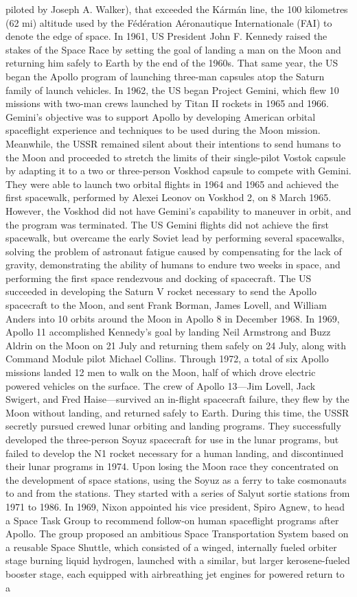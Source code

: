\documentclass[12pt]{article}
\begin{document}
piloted by Joseph A. Walker), that exceeded the Kármán line, the 100 kilometres (62 mi) altitude used by the Fédération Aéronautique Internationale (FAI) to denote the edge of space. In 1961, US President John F. Kennedy raised the stakes of the Space Race by setting the goal of landing a man on the Moon and returning him safely to Earth by the end of the 1960s. That same year, the US began the Apollo program of launching three-man capsules atop the Saturn family of launch vehicles. In 1962, the US began Project Gemini, which flew 10 missions with two-man crews launched by Titan II rockets in 1965 and 1966. Gemini's objective was to support Apollo by developing American orbital spaceflight experience and techniques to be used during the Moon mission. Meanwhile, the USSR remained silent about their intentions to send humans to the Moon and proceeded to stretch the limits of their single-pilot Vostok capsule by adapting it to a two or three-person Voskhod capsule to compete with Gemini. They were able to launch two orbital flights in 1964 and 1965 and achieved the first spacewalk, performed by Alexei Leonov on Voskhod 2, on 8 March 1965. However, the Voskhod did not have Gemini's capability to maneuver in orbit, and the program was terminated. The US Gemini flights did not achieve the first spacewalk, but overcame the early Soviet lead by performing several spacewalks, solving the problem of astronaut fatigue caused by compensating for the lack of gravity, demonstrating the ability of humans to endure two weeks in space, and performing the first space rendezvous and docking of spacecraft. The US succeeded in developing the Saturn V rocket necessary to send the Apollo spacecraft to the Moon, and sent Frank Borman, James Lovell, and William Anders into 10 orbits around the Moon in Apollo 8 in December 1968. In 1969, Apollo 11 accomplished Kennedy's goal by landing Neil Armstrong and Buzz Aldrin on the Moon on 21 July and returning them safely on 24 July, along with Command Module pilot Michael Collins. Through 1972, a total of six Apollo missions landed 12 men to walk on the Moon, half of which drove electric powered vehicles on the surface. The crew of Apollo 13—Jim Lovell, Jack Swigert, and Fred Haise—survived an in-flight spacecraft failure, they flew by the Moon without landing, and returned safely to Earth. During this time, the USSR secretly pursued crewed lunar orbiting and landing programs. They successfully developed the three-person Soyuz spacecraft for use in the lunar programs, but failed to develop the N1 rocket necessary for a human landing, and discontinued their lunar programs in 1974. Upon losing the Moon race they concentrated on the development of space stations, using the Soyuz as a ferry to take cosmonauts to and from the stations. They started with a series of Salyut sortie stations from 1971 to 1986. In 1969, Nixon appointed his vice president, Spiro Agnew, to head a Space Task Group to recommend follow-on human spaceflight programs after Apollo. The group proposed an ambitious Space Transportation System based on a reusable Space Shuttle, which consisted of a winged, internally fueled orbiter stage burning liquid hydrogen, launched with a similar, but larger kerosene-fueled booster stage, each equipped with airbreathing jet engines for powered return to a 
\end{document}
